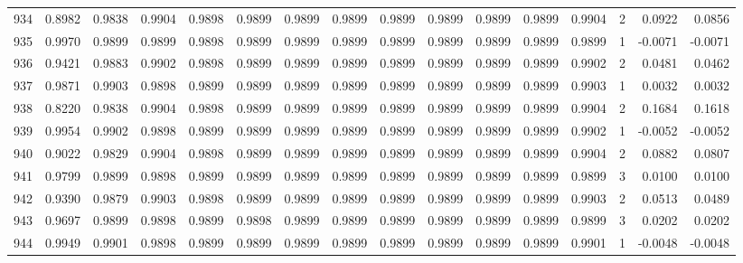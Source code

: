 \begin{tabular}{lrrrrrrrrrrrrrrr}
934 &      0.8982 &  0.9838 &  0.9904 &  0.9898 &  0.9899 &  0.9899 &  0.9899 &  0.9899 &  0.9899 &  0.9899 &   0.9899 &     0.9904 &      2 &                    0.0922 &                     0.0856 \\
935 &      0.9970 &  0.9899 &  0.9899 &  0.9898 &  0.9899 &  0.9899 &  0.9899 &  0.9899 &  0.9899 &  0.9899 &   0.9899 &     0.9899 &      1 &                   -0.0071 &                    -0.0071 \\
936 &      0.9421 &  0.9883 &  0.9902 &  0.9898 &  0.9899 &  0.9899 &  0.9899 &  0.9899 &  0.9899 &  0.9899 &   0.9899 &     0.9902 &      2 &                    0.0481 &                     0.0462 \\
937 &      0.9871 &  0.9903 &  0.9898 &  0.9899 &  0.9899 &  0.9899 &  0.9899 &  0.9899 &  0.9899 &  0.9899 &   0.9899 &     0.9903 &      1 &                    0.0032 &                     0.0032 \\
938 &      0.8220 &  0.9838 &  0.9904 &  0.9898 &  0.9899 &  0.9899 &  0.9899 &  0.9899 &  0.9899 &  0.9899 &   0.9899 &     0.9904 &      2 &                    0.1684 &                     0.1618 \\
939 &      0.9954 &  0.9902 &  0.9898 &  0.9899 &  0.9899 &  0.9899 &  0.9899 &  0.9899 &  0.9899 &  0.9899 &   0.9899 &     0.9902 &      1 &                   -0.0052 &                    -0.0052 \\
940 &      0.9022 &  0.9829 &  0.9904 &  0.9898 &  0.9899 &  0.9899 &  0.9899 &  0.9899 &  0.9899 &  0.9899 &   0.9899 &     0.9904 &      2 &                    0.0882 &                     0.0807 \\
941 &      0.9799 &  0.9899 &  0.9898 &  0.9899 &  0.9899 &  0.9899 &  0.9899 &  0.9899 &  0.9899 &  0.9899 &   0.9899 &     0.9899 &      3 &                    0.0100 &                     0.0100 \\
942 &      0.9390 &  0.9879 &  0.9903 &  0.9898 &  0.9899 &  0.9899 &  0.9899 &  0.9899 &  0.9899 &  0.9899 &   0.9899 &     0.9903 &      2 &                    0.0513 &                     0.0489 \\
943 &      0.9697 &  0.9899 &  0.9898 &  0.9899 &  0.9898 &  0.9899 &  0.9899 &  0.9899 &  0.9899 &  0.9899 &   0.9899 &     0.9899 &      3 &                    0.0202 &                     0.0202 \\
944 &      0.9949 &  0.9901 &  0.9898 &  0.9899 &  0.9899 &  0.9899 &  0.9899 &  0.9899 &  0.9899 &  0.9899 &   0.9899 &     0.9901 &      1 &                   -0.0048 &                    -0.0048 \\

\end{tabular}
